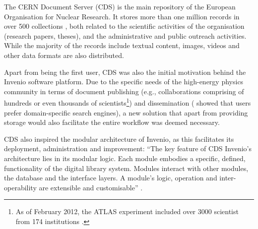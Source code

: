 
The CERN Document Server (CDS) is the main repository of the European
Organisation for Nuclear Research.  It stores more than one million
records \cite{ref:cds} in over 500 collections \cite{ref:ludmilathesis}, both
related to the scientific activities of the organisation (research papers,
theses), and the administrative and public outreach activities. While the
majority of the records include textual content, images, videos and other data
formats are also distributed.

Apart from being the first user, CDS was also the initial motivation behind the
Invenio software platform. Due to the specific needs of the high-energy physics
community in terms of document publishing (e.g., collaborations comprising of
hundreds or even thousands of scientists\footnote{As of February 2012, the
ATLAS experiment included over 3000 scientist from 174 institutions
\cite{ref:atlas}.}) and dissemination (\cite{ref:annette} showed that users
prefer domain-specific search engines), a new solution that apart from
providing storage would also facilitate the entire workflow was deemed
necessary.

CDS also inspired the modular architecture of Invenio, as this facilitates its
deployment, administration and improvement: ``The key feature of CDS Invenio's
architecture lies in its modular logic. Each module embodies a specific,
defined, functionality of the digital library system. Modules interact with
other modules, the database and the interface layers. A module's logic,
operation and inter-operability are extensible and
customisable'' \cite{ref:lemeur}.
